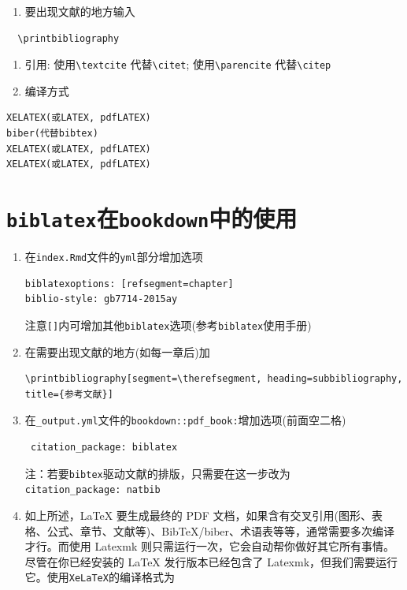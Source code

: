 \documentclass[12pt,]{krantz}
\providecommand{\tightlist}{%
  \setlength{\itemsep}{0pt}\setlength{\parskip}{0pt}}
\theoremstyle{plain}
\theoremstyle{nonumberplain}
\begin{document}
\begin{enumerate}
\def\labelenumi{\arabic{enumi}.}
\setcounter{enumi}{2}
\tightlist
\item
  要出现文献的地方输入
\end{enumerate}

\begin{verbatim}
  \printbibliography
\end{verbatim}

\begin{enumerate}
\def\labelenumi{\arabic{enumi}.}
\setcounter{enumi}{3}
\item
  引用: 使用\texttt{\textbackslash{}textcite} 代替\texttt{\textbackslash{}citet}; 使用\texttt{\textbackslash{}parencite} 代替\texttt{\textbackslash{}citep}
\item
  编译方式
\end{enumerate}

\begin{verbatim}
XELATEX(或LATEX, pdfLATEX)
biber(代替bibtex)
XELATEX(或LATEX, pdfLATEX)
XELATEX(或LATEX, pdfLATEX)
\end{verbatim}

\hypertarget{sec10-3}{%
\section{\texorpdfstring{\texttt{biblatex}在\texttt{bookdown}中的使用}{biblatex在bookdown中的使用}}\label{sec10-3}}

\begin{enumerate}
\def\labelenumi{\arabic{enumi}.}
\item
  在\texttt{index.Rmd}文件的\texttt{yml}部分增加选项

\begin{verbatim}
biblatexoptions: [refsegment=chapter]
biblio-style: gb7714-2015ay
\end{verbatim}

  注意\texttt{{[}{]}}内可增加其他\texttt{biblatex}选项(参考\texttt{biblatex}使用手册)
\item
  在需要出现文献的地方(如每一章后)加

\begin{verbatim}
\printbibliography[segment=\therefsegment, heading=subbibliography, title={参考文献}]
\end{verbatim}
\item
  在\texttt{\_output.yml}文件的\texttt{bookdown::pdf\_book:}增加选项(前面空二格)

\begin{verbatim}
 citation_package: biblatex
\end{verbatim}

  注：若要\texttt{bibtex}驱动文献的排版，只需要在这一步改为\texttt{citation\_package:\ natbib}
\item
  如上所述，LaTeX 要生成最终的 PDF 文档，如果含有交叉引用(图形、表格、公式、章节、文献等)、BibTeX/biber、术语表等等，通常需要多次编译才行。而使用 Latexmk 则只需运行一次，它会自动帮你做好其它所有事情。尽管在你已经安装的 LaTeX 发行版本已经包含了 Latexmk，但我们需要运行它。使用\texttt{XeLaTeX}的编译格式为
\end{enumerate}
\end{document}
